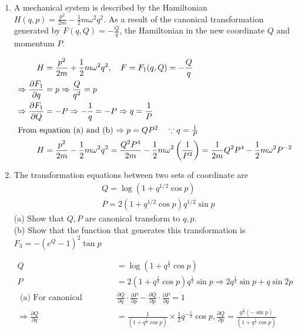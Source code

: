 \begin{enumerate}
	\item A mechanical system is described by the Hamiltonian $H(q, p)=\frac{p^{2}}{2 m}-\frac{1}{2} m \omega^{2} q^{2}$. As a result of the canonical transformation generated by $F(q, Q)=-\frac{Q}{q}$, the Hamiltonian in the new coordinate $Q$ and momentum $P$.
	\begin{answer}
		\begin{align*}
		H&=\frac{p^{2}}{2 m}+\frac{1}{2} m \omega^{2} q^{2}, \quad F=F_{1}(q, Q)=-\frac{Q}{q}\\
		\Rightarrow \frac{\partial F_{1}}{\partial q}&=p \Rightarrow \frac{Q}{q^{2}}=p\\
		\Rightarrow \frac{\partial F_{1}}{\partial Q}&=-P \Rightarrow-\frac{1}{q}=-P \Rightarrow q=\frac{1}{P}\\
		\intertext{From equation (a) and (b) $\Rightarrow p=Q P^{2}\quad 
			\because q=\frac{1}{P}
			$}
		H&=\frac{p^{2}}{2 m}-\frac{1}{2} m \omega^{2} q^{2}=\frac{Q^{2} P^{4}}{2 m}-\frac{1}{2} m \omega^{2}\left(\frac{1}{P^{2}}\right)=\frac{1}{2 m} Q^{2} P^{4}-\frac{1}{2} m \omega^{2} P^{-2}
		\end{align*}
	\end{answer}
	\item The transformation equations between two sets of coordinate are
	$$
	\begin{aligned}
	&Q=\log \left(1+q^{1 / 2} \cos p\right) \\
	&P=2\left(1+q^{1 / 2} \cos p\right) q^{1 / 2} \sin p
	\end{aligned}
	$$
	(a) Show that $Q, P$ are canonical transform to $q, p$.\\
	(b) Show that the function that generates this transformation is $F_{3}=-\left(e^{Q}-1\right)^{2} \tan p$
	\begin{answer}
		\begin{align*}
		Q&=\log \left(1+q^{\frac{1}{2}} \cos p\right)\\
		P&=2\left(1+q^{\frac{1}{2}} \cos p\right) q^{\frac{1}{2}} \sin p \Rightarrow 2 q^{\frac{1}{2}} \sin p+q \sin 2 p\\
	\text{	(a) For canonical transformation:}&
		\frac{\partial Q}{\partial q} \cdot \frac{\partial P}{\partial p}-\frac{\partial Q}{\partial p} \cdot \frac{\partial P}{\partial q}=1\\
		\Rightarrow \frac{\partial Q}{\partial q}&=\frac{1}{\left(1+q^{\frac{1}{2}} \cos p\right)} \times \frac{1}{2} q^{-\frac{1}{2}} \cos p, \frac{\partial Q}{\partial p}=\frac{q^{\frac{1}{2}}(-\sin p)}{\left(1+q^{\frac{1}{2}} \cos p\right)}\\

\end{align*}
\end{answer}
\end{enumerate}
